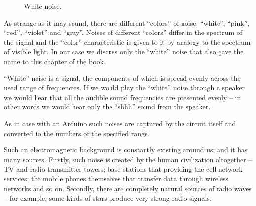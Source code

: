 \documentclass[../sparc.tex]{subfiles}
\begin{document}
\begin{figure}[ht]
  \centering
  \caption{White noise.}
  \label{fig:white-noize}
\end{figure}

As strange as it may sound, there are different ``colors'' of noise: ``white'',
``pink'', ``red'', ``violet'' and ``gray''.  Noises of different ``colors''
differ in the spectrum of the signal and the ``color'' characteristic is given
to it by analogy to the spectrum of visible light.  In our case we discuss only
the ``white'' noise that also gave the name to this chapter of the book.

``White'' noise is a signal, the components of which is spread evenly across the
used range of frequencies.  If we would play the ``white'' noise through a
speaker we would hear that all the audible sound frequencies are presented
evenly -- in other words we would hear only the ``shhh'' sound from the speaker.


As in case with an Arduino such noises are captured by the circuit itself and
converted to the numbers of the  specified range.

Such an electromagnetic background is constantly existing around us; and it has
many sources.  Firstly, such noise is created by the human civilization
altogether -- TV and radio-transmitter towers; base stations that providing the
cell network services; the mobile phones themselves that transfer data through
wireless networks and so on.  Secondly, there are completely natural sources of
radio waves -- for example, some kinds of stars produce very strong radio
signals.
\end{document}
